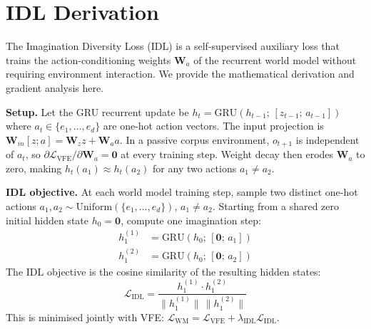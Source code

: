 \documentclass[journal,onecolumn,11pt]{IEEEtran}
\begin{document}
\section{IDL Derivation}\label{app:idl}

The Imagination Diversity Loss (IDL) is a self-supervised auxiliary loss that
trains the action-conditioning weights $\mathbf{W}_a$ of the recurrent world model
without requiring environment interaction.
We provide the mathematical derivation and gradient analysis here.

\textbf{Setup.}
Let the GRU recurrent update be
$h_t = \text{GRU}(h_{t-1};\, [z_{t-1};\, a_{t-1}])$
where $a_t \in \{e_1, \ldots, e_d\}$ are one-hot action vectors.
The input projection is $\mathbf{W}_{in}[z; a] = \mathbf{W}_z z + \mathbf{W}_a a$.
In a passive corpus environment, $o_{t+1}$ is independent of $a_t$, so
$\partial \mathcal{L}_{\text{VFE}} / \partial \mathbf{W}_a = \mathbf{0}$ at every training step.
Weight decay then erodes $\mathbf{W}_a$ to zero, making
$h_t(a_1) \approx h_t(a_2)$ for any two actions $a_1 \neq a_2$.

\textbf{IDL objective.}
At each world model training step, sample two distinct one-hot actions
$a_1, a_2 \sim \text{Uniform}(\{e_1,\ldots,e_d\})$, $a_1 \neq a_2$.
Starting from a shared zero initial hidden state $h_0 = \mathbf{0}$,
compute one imagination step:
\begin{align}
  h_1^{(1)} &= \text{GRU}(h_0;\, [\mathbf{0};\, a_1]) \\
  h_1^{(2)} &= \text{GRU}(h_0;\, [\mathbf{0};\, a_2])
\end{align}
The IDL objective is the cosine similarity of the resulting hidden states:
\begin{equation}
  \mathcal{L}_{\text{IDL}} = \frac{h_1^{(1)} \cdot h_1^{(2)}}{\|h_1^{(1)}\|\,\|h_1^{(2)}\|}
  \label{eq:idl}
\end{equation}
This is minimised jointly with VFE: $\mathcal{L}_{\text{WM}} = \mathcal{L}_{\text{VFE}} + \lambda_{\text{IDL}} \mathcal{L}_{\text{IDL}}$.
\end{document}
